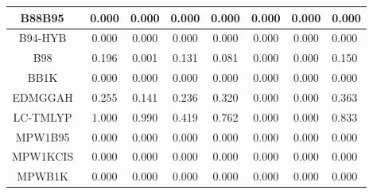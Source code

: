 \begin{tabular}{|c|c|c|c|c|c|c|l|}
                                     B88B95~\cite{Becke1996_1040} &                0.000 &                          0.000 &             0.000 &                        0.000 &                0.000 &                0.000 &                       0.000 \\ \hline
                                     B94-HYB~\cite{Becke1994_625} &                0.000 &                          0.000 &             0.000 &                        0.000 &                0.000 &                0.000 &                       0.000 \\ \hline
                                        B98~\cite{Becke1998_2092} &                0.196 &                          0.001 &             0.131 &                        0.081 &                0.000 &                0.000 &                       0.150 \\ \hline
                                        BB1K~\cite{Zhao2004_2715} &                0.000 &                          0.000 &             0.000 &                        0.000 &                0.000 &                0.000 &                       0.000 \\ \hline
                                      EDMGGAH~\cite{Tao2002_2335} &                0.255 &                          0.141 &             0.236 &                        0.320 &                0.000 &                0.000 &                       0.363 \\ \hline
                                       LC-TMLYP~\cite{Jana2018_1} &                1.000 &                          0.990 &             0.419 &                        0.762 &                0.000 &                0.000 &                       0.833 \\ \hline
                                     MPW1B95~\cite{Zhao2004_6908} &                0.000 &                          0.000 &             0.000 &                        0.000 &                0.000 &                0.000 &                       0.000 \\ \hline
                                    MPW1KCIS~\cite{Zhao2005_2012} &                0.000 &                          0.000 &             0.000 &                        0.000 &                0.000 &                0.000 &                       0.000 \\ \hline
                                      MPWB1K~\cite{Zhao2004_6908} &                0.000 &                          0.000 &             0.000 &                        0.000 &                0.000 &                0.000 &                       0.000 \\ \hline

\end{tabular}
